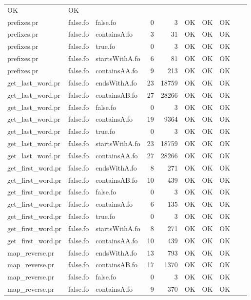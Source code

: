 \begin{tabular}{l|l|l|r|r|r|r|r|r|r}
OK & OK \\
prefixes.pr & false.fo & false.fo & 0 & 3 & OK & 
OK & OK \\
prefixes.pr & false.fo & containsA.fo & 3 & 31 & OK & 
OK & OK \\
prefixes.pr & false.fo & true.fo & 0 & 3 & OK & 
OK & OK \\
prefixes.pr & false.fo & startsWithA.fo & 6 & 81 & OK & 
OK & OK \\
prefixes.pr & false.fo & containsAA.fo & 9 & 213 & OK & 
OK & OK \\
get\_last\_word.pr & false.fo & endsWithA.fo & 23 & 18759 & OK & 
OK & OK \\
get\_last\_word.pr & false.fo & containsAB.fo & 27 & 28266 & OK & 
OK & OK \\
get\_last\_word.pr & false.fo & false.fo & 0 & 3 & OK & 
OK & OK \\
get\_last\_word.pr & false.fo & containsA.fo & 19 & 9364 & OK & 
OK & OK \\
get\_last\_word.pr & false.fo & true.fo & 0 & 3 & OK & 
OK & OK \\
get\_last\_word.pr & false.fo & startsWithA.fo & 23 & 18759 & OK & 
OK & OK \\
get\_last\_word.pr & false.fo & containsAA.fo & 27 & 28266 & OK & 
OK & OK \\
get\_first\_word.pr & false.fo & endsWithA.fo & 8 & 271 & OK & 
OK & OK \\
get\_first\_word.pr & false.fo & containsAB.fo & 10 & 439 & OK & 
OK & OK \\
get\_first\_word.pr & false.fo & false.fo & 0 & 3 & OK & 
OK & OK \\
get\_first\_word.pr & false.fo & containsA.fo & 6 & 135 & OK & 
OK & OK \\
get\_first\_word.pr & false.fo & true.fo & 0 & 3 & OK & 
OK & OK \\
get\_first\_word.pr & false.fo & startsWithA.fo & 8 & 271 & OK & 
OK & OK \\
get\_first\_word.pr & false.fo & containsAA.fo & 10 & 439 & OK & 
OK & OK \\
map\_reverse.pr & false.fo & endsWithA.fo & 13 & 793 & OK & 
OK & OK \\
map\_reverse.pr & false.fo & containsAB.fo & 17 & 1370 & OK & 
OK & OK \\
map\_reverse.pr & false.fo & false.fo & 0 & 3 & OK & 
OK & OK \\
map\_reverse.pr & false.fo & containsA.fo & 9 & 370 & OK & 
OK & OK \\

\end{tabular}
